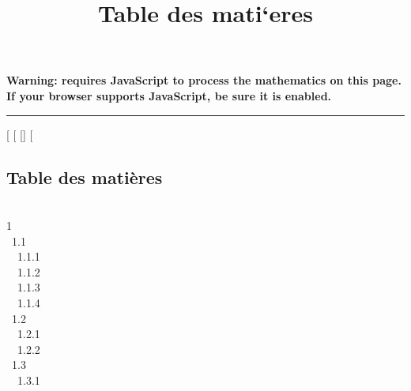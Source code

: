 \documentclass[]{article}
\title{Table des mati`eres}
\author{}
\date{}
\begin{document}
\maketitle

\textbf{Warning: 
requires JavaScript to process the mathematics on this page.\\ If your
browser supports JavaScript, be sure it is enabled.}

\begin{center}\rule{3in}{0.4pt}\end{center}

[
[
[]
[

\subsection{Table des matières}

 \\ 1
 \\ ~1.1
 \\ ~~1.1.1
 \\ ~~1.1.2
 \\ ~~1.1.3
 \\ ~~1.1.4
 \\ ~1.2
 \\
~~1.2.1  \\
~~1.2.2  \\
~1.3  \\ ~~1.3.1
\end{document}
